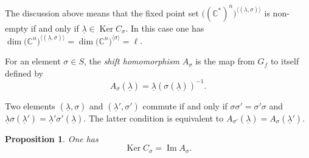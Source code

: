 \documentclass[pdftex]{sigma}
\numberwithin{equation}{section}
\newtheorem{Proposition}[Theorem]{Proposition}
 { \theoremstyle{definition}
\newtheorem{Definition}[Theorem]{Definition}
\newtheorem{Remark}[Theorem]{Remark} }
\begin{document}
The discussion above means that the fixed point set $\big(({\mathbb C}^*)^n\big)^{\langle (\underline{\lambda},\sigma) \rangle}$
is non-empty if and only if $\underline{\lambda} \in \operatorname{Ker} C_\sigma$.
In this case one has $\dim \big({\mathbb C}^n\big)^{\langle (\underline{\lambda},\sigma) \rangle}=\dim \big({\mathbb C}^n\big)^{\langle \sigma \rangle}=\ell$.

\begin{Definition} For an element $\sigma \in S$, the {\em shift homomorphism} $A_\sigma$ is the map from $G_f$ to itself defined by
\[
A_\sigma(\underline{\lambda}) = \underline{\lambda}(\sigma(\underline{\lambda}))^{-1}.
\]
\end{Definition}

\begin{Remark} \label{rem:comm}
Two elements $(\underline{\lambda},\sigma)$ and $(\underline{\lambda}', \sigma')$ commute if and only if
$\sigma \sigma'=\sigma' \sigma$ and $\underline{\lambda}\sigma(\underline{\lambda}') =
\underline{\lambda}' \sigma'(\underline{\lambda})$. The latter condition is equivalent to
$A_{\sigma'}(\underline{\lambda})=A_\sigma(\underline{\lambda}')$.
\end{Remark}

\begin{Proposition} \label{prop:C=A}
One has
\[
\operatorname{Ker} C_\sigma = \operatorname{Im} A_\sigma.
\]
\end{Proposition}
\end{document}
